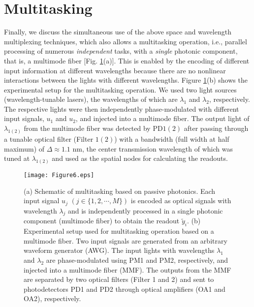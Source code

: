 \documentclass{article}
\begin{document}
\section{Multitasking \label{sec5}}
Finally, we discuss the simultaneous use of the above space and wavelength
multiplexing techniques, which also allows a multitasking operation, i.e., 
 parallel processing of numerous {\it independent} tasks, 
with a {\it single} photonic
component, that is, a multimode fiber [Fig. \ref{fig6}(a)].
%
This is enabled by the encoding of different input information 
at different wavelengths because there are no nonlinear interactions
between the lights with different wavelengths.
%
Figure \ref{fig6}(b) shows the experimental setup for the multitasking operation. 
%
We used two light sources (wavelength-tunable lasers), the wavelengths of which are $\lambda_1$ and
$\lambda_2$, respectively. 
%
The respective lights were then independently phase-modulated with
different input signals, $u_1$ and $u_2$, and injected into 
a multimode fiber. 
%
The output light of $\lambda_{1(2)}$ from the multimode fiber was detected by
PD${1(2)}$ after passing through a tunable optical filter (Filter ${1(2)}$) with
a bandwidth (full width at half maximum) of $\Delta \approx 1.1$ nm,
the center transmission wavelength of which was tuned at $\lambda_{1(2)}$ 
and used as the spatial nodes for calculating the readouts. 
%
%
\begin{figure}[htbp]
\centering\texttt{[image: Figure6.eps]}
\caption{\label{fig6}
(a) Schematic of multitasking based on passive photonics. 
%
Each input signal $u_j$  $(j \in \{1,2,\cdots, M\})$ 
is encoded as optical signals with wavelength $\lambda_j$
and is independently processed 
in a single photonic component (multimode fiber)
to obtain the readout $\tilde{y}_i$.   
% 
(b) Experimental setup used for multitasking operation based on a
 multimode fiber.
%
Two input signals are generated from an arbitrary waveform generator
 (AWG).
%
The input lights with wavelengths $\lambda_1$ and
 $\lambda_2$ are phase-modulated using PM1 and PM2, respectively, 
and injected into a multimode fiber (MMF).  
%
The outputs from the MMF are separated by two optical filters (Filter 1
 and 2) and sent to photodetectors PD1 and PD2 through optical amplifiers
 (OA1 and OA2), respectively.   
}
\end{figure}
%
\end{document}
